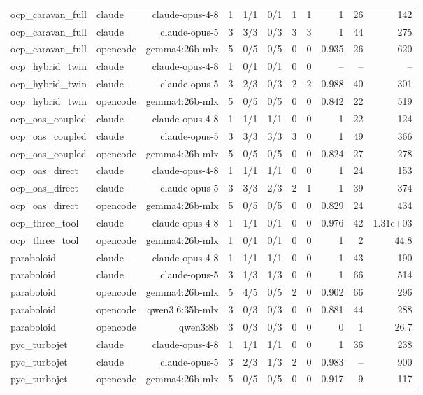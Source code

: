 \begin{tabular}{llrrrrrrrrr}
\addlinespace
ocp\_caravan\_full & claude & claude-opus-4-8 & 1 & 1/1 & 0/1 & 1 & 1 & 1 & 26 & 142 \\
\addlinespace
ocp\_caravan\_full & claude & claude-opus-5 & 3 & 3/3 & 0/3 & 3 & 3 & 1 & 44 & 275 \\
\addlinespace
ocp\_caravan\_full & opencode & gemma4:26b-mlx & 5 & 0/5 & 0/5 & 0 & 0 & 0.935 & 26 & 620 \\
\addlinespace
ocp\_hybrid\_twin & claude & claude-opus-4-8 & 1 & 0/1 & 0/1 & 0 & 0 & -- & -- & -- \\
\addlinespace
ocp\_hybrid\_twin & claude & claude-opus-5 & 3 & 2/3 & 0/3 & 2 & 2 & 0.988 & 40 & 301 \\
\addlinespace
ocp\_hybrid\_twin & opencode & gemma4:26b-mlx & 5 & 0/5 & 0/5 & 0 & 0 & 0.842 & 22 & 519 \\
\addlinespace
ocp\_oas\_coupled & claude & claude-opus-4-8 & 1 & 1/1 & 1/1 & 0 & 0 & 1 & 22 & 124 \\
\addlinespace
ocp\_oas\_coupled & claude & claude-opus-5 & 3 & 3/3 & 3/3 & 3 & 0 & 1 & 49 & 366 \\
\addlinespace
ocp\_oas\_coupled & opencode & gemma4:26b-mlx & 5 & 0/5 & 0/5 & 0 & 0 & 0.824 & 27 & 278 \\
\addlinespace
ocp\_oas\_direct & claude & claude-opus-4-8 & 1 & 1/1 & 1/1 & 0 & 0 & 1 & 24 & 153 \\
\addlinespace
ocp\_oas\_direct & claude & claude-opus-5 & 3 & 3/3 & 2/3 & 2 & 1 & 1 & 39 & 374 \\
\addlinespace
ocp\_oas\_direct & opencode & gemma4:26b-mlx & 5 & 0/5 & 0/5 & 0 & 0 & 0.829 & 24 & 434 \\
\addlinespace
ocp\_three\_tool & claude & claude-opus-4-8 & 1 & 1/1 & 0/1 & 0 & 0 & 0.976 & 42 & 1.31e+03 \\
\addlinespace
ocp\_three\_tool & opencode & gemma4:26b-mlx & 1 & 0/1 & 0/1 & 0 & 0 & 1 & 2 & 44.8 \\
\addlinespace
paraboloid & claude & claude-opus-4-8 & 1 & 1/1 & 1/1 & 0 & 0 & 1 & 43 & 190 \\
\addlinespace
paraboloid & claude & claude-opus-5 & 3 & 1/3 & 1/3 & 0 & 0 & 1 & 66 & 514 \\
\addlinespace
paraboloid & opencode & gemma4:26b-mlx & 5 & 4/5 & 0/5 & 2 & 0 & 0.902 & 66 & 296 \\
\addlinespace
paraboloid & opencode & qwen3.6:35b-mlx & 3 & 0/3 & 0/3 & 0 & 0 & 0.881 & 44 & 288 \\
\addlinespace
paraboloid & opencode & qwen3:8b & 3 & 0/3 & 0/3 & 0 & 0 & 0 & 1 & 26.7 \\
\addlinespace
pyc\_turbojet & claude & claude-opus-4-8 & 1 & 1/1 & 1/1 & 0 & 0 & 1 & 36 & 238 \\
\addlinespace
pyc\_turbojet & claude & claude-opus-5 & 3 & 2/3 & 1/3 & 2 & 0 & 0.983 & -- & 900 \\
\addlinespace
pyc\_turbojet & opencode & gemma4:26b-mlx & 5 & 0/5 & 0/5 & 0 & 0 & 0.917 & 9 & 117 \\
\bottomrule
\end{tabular}
